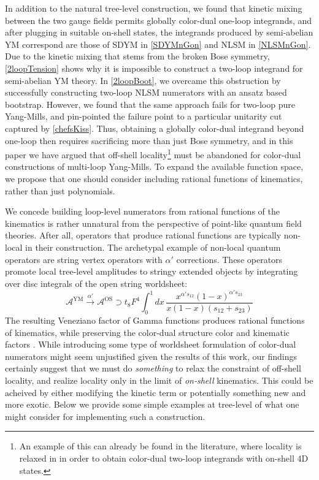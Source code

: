 \documentclass[11pt,letter]{article}
\def\be{\begin{equation}}
\def\ee{\end{equation}}
\begin{document}
In addition to the natural tree-level construction, we found that kinetic mixing
between the two gauge fields permits globally color-dual one-loop
integrands, and after plugging in suitable on-shell states, the integrands
produced by semi-abelian YM correspond are those of SDYM in \cref{SDYMnGon} 
and NLSM in \cref{NLSMnGon}.  Due to the
kinetic mixing that stems from the broken Bose symmetry, \cref{2loopTension} shows why it is
impossible to construct a two-loop integrand for semi-abelian YM theory. In \cref{2loopBoot}, we overcame this obstruction by successfully constructing two-loop NLSM numerators with an ansatz based bootstrap. However, we found that the same approach fails for two-loop pure Yang-Mills, and pin-pointed the failure point to a particular unitarity cut captured by \cref{chefsKiss}. Thus, obtaining a globally color-dual
integrand beyond one-loop then requires sacrificing more than just Bose
symmetry, and in this paper we have argued that off-shell locality\footnote{An example of this can already be found in the literature, where locality is relaxed in \cite{Mogull:2015adi} in
  order to obtain color-dual two-loop integrands with on-shell 4D states.} must
be abandoned for color-dual constructions of multi-loop Yang-Mills. To expand the available function space, we propose that one should consider including rational functions of kinematics, rather than just polynomials.

We concede building loop-level numerators from rational functions of the kinematics
is rather unnatural from the perspective of point-like quantum field
theories. After all, operators that produce rational functions are typically non-local in their construction. The archetypal example of non-local quantum operators are string vertex operators with $\alpha'$ corrections. These operators promote local tree-level amplitudes to stringy extended objects by integrating over disc integrals of the open string worldsheet:
\be
\mathcal{A}^{\text{YM}} \stackrel{\alpha'}{\longrightarrow} \mathcal{A}^{\text{OS}}\supset t_8 F^4 \int_0^1 dx \,\frac{ x^{\alpha' s_{12}}(1-x)^{\alpha' s_{23}}}{x(1-x)(s_{12}+s_{23})}
\ee
The resulting Veneziano factor of Gamma functions produces rational functions of kinematics, while preserving the color-dual structure color and kinematic factors \cite{MafraBCJAmplString,Broedel:2013tta,Mafra:2016mcc,Carrasco:2019yyn}. While introducing some type of worldsheet formulation of color-dual numerators might seem unjustified given the results of this work, our findings certainly suggest that we must do \textit{something} to relax the constraint of off-shell locality, and realize locality only in the limit of
\textit{on-shell} kinematics. This could be acheived by either modifying the kinetic term or potentially something new and more exotic. Below we provide some simple examples
at tree-level of what one might consider for implementing such a construction.
\end{document}
